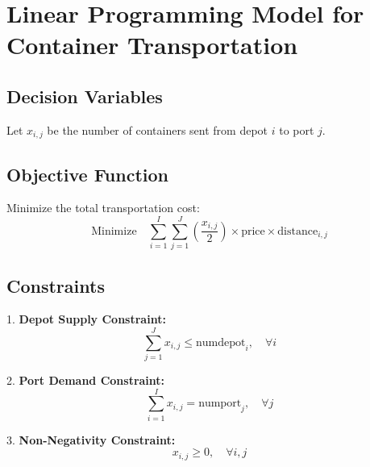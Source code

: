 \documentclass{article}
\begin{document}
\section*{Linear Programming Model for Container Transportation}

\subsection*{Decision Variables}
Let \( x_{i,j} \) be the number of containers sent from depot \( i \) to port \( j \).

\subsection*{Objective Function}
Minimize the total transportation cost:
\[
\text{Minimize} \quad \sum_{i=1}^I \sum_{j=1}^J \left( \frac{x_{i,j}}{2} \right) \times \text{price} \times \text{distance}_{i,j}
\]

\subsection*{Constraints}

1. \textbf{Depot Supply Constraint:}
   \[
   \sum_{j=1}^J x_{i,j} \leq \text{numdepot}_i, \quad \forall i
   \]

2. \textbf{Port Demand Constraint:}
   \[
   \sum_{i=1}^I x_{i,j} = \text{numport}_j, \quad \forall j
   \]

3. \textbf{Non-Negativity Constraint:}
   \[
   x_{i,j} \geq 0, \quad \forall i, j
   \]
\end{document}
